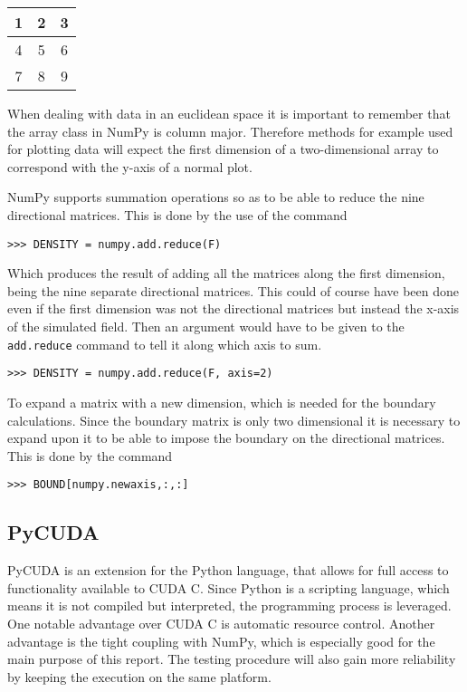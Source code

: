 \begin{tabular}{|c|c|c|}
\hline
1 & 2 & 3 \\
\hline
4 & 5 & 6 \\
\hline
7 & 8 & 9 \\
\hline
\end{tabular}

When dealing with data in an euclidean space it is important to remember that the array class in NumPy is column major. Therefore methods for example used for plotting data will expect the first dimension of a two-dimensional array to correspond with the y-axis of a normal plot. 

NumPy supports summation operations so as to be able to reduce the nine directional matrices. This is done by the use of the command

\begin{verbatim}
>>> DENSITY = numpy.add.reduce(F)
\end{verbatim}

Which produces the result of adding all the matrices along the first dimension, being the nine separate directional matrices. This could of course have been done even if the first dimension was not the directional matrices but instead the x-axis of the simulated field. Then an argument would have to be given to the \texttt{add.reduce} command to tell it along which axis to sum.

\begin{verbatim}
>>> DENSITY = numpy.add.reduce(F, axis=2)
\end{verbatim}

To expand a matrix with a new dimension, which is needed for the boundary calculations. Since the boundary matrix is only two dimensional it is necessary to expand upon it to be able to impose the boundary on the directional matrices. This is done by the command

\begin{verbatim}
>>> BOUND[numpy.newaxis,:,:]
\end{verbatim}



\subsection{PyCUDA}
PyCUDA is an extension for the Python language, that allows for full access to functionality available to CUDA C. Since Python is a scripting language, which means it is not compiled but interpreted, the programming process is leveraged. One notable advantage over CUDA C is automatic resource control. Another advantage is the tight coupling with NumPy, which is especially good for the main purpose of this report. The testing procedure will also gain more reliability by keeping the execution on the same platform.

